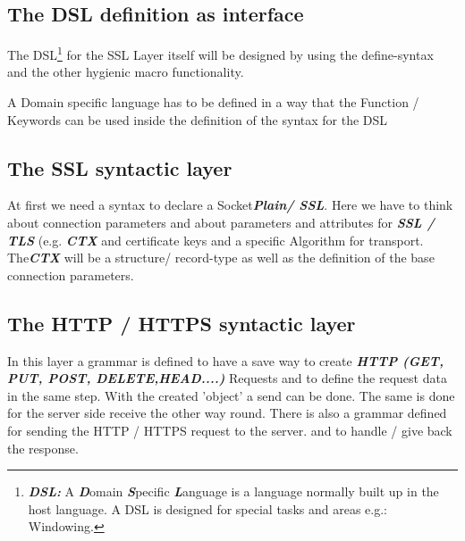 \documentclass[10pt,a4paper,english]{article}
\newcommand{\abbrhighcol}[1]{\textbf{\textit{#1}}}
\begin{document}
\begin{multicols}{2}
\subsection{The DSL definition as interface}
\begin{flushleft}
The DSL\footnote{\abbrhighcol{DSL: } A \abbrhighcol {D}omain \abbrhighcol{S}pecific \abbrhighcol{L}anguage is a language normally built up in the host language. A DSL is designed for special tasks and areas e.g.: Windowing.} for the SSL Layer itself will be designed by using the define-syntax and the other hygienic macro functionality.
\end{flushleft}
A Domain specific language has to be defined in a way that the Function / Keywords can be used inside the definition of the syntax for the DSL

\subsection{The SSL syntactic layer}
\begin{flushleft}
 At first we need a syntax to declare a Socket\abbrhighcol  {Plain/ SSL}. Here we have to think about connection parameters and about parameters and attributes for \abbrhighcol  {SSL / TLS} (e.g. \abbrhighcol  {CTX} and certificate keys and a specific Algorithm for transport. 
The\abbrhighcol  {CTX} will be a structure/ record-type as well as the definition of the base connection parameters. 
\end{flushleft}

\subsection{The HTTP / HTTPS  syntactic layer}
\begin{flushleft}
In this layer a grammar is defined to have a save way to create \abbrhighcol{ HTTP (GET, PUT, POST, DELETE,HEAD....)} Requests and to define the request data in the same step. With the created 'object' a send can be done. The same is done for the server side receive the other way round. There is also a grammar defined for sending the HTTP / HTTPS request to the server. and to handle / give back the response. 
\end{flushleft}



\end{multicols}
\end{document}

